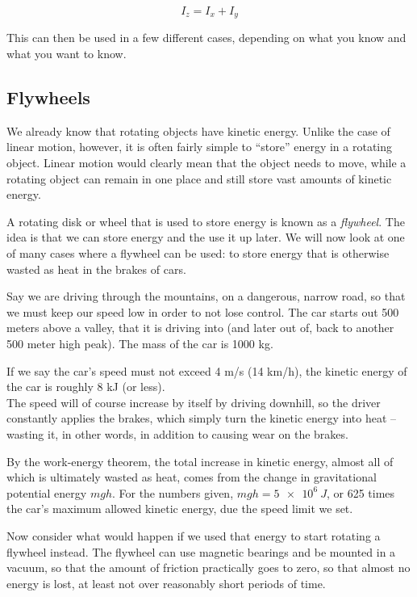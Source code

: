 \documentclass[12pt,a4paper]{report}
\begin{document}
\begin{equation}
I_z = I_x + I_y
\end{equation}

This can then be used in a few different cases, depending on what you know and what you want to know.

\subsection{Flywheels}

We already know that rotating objects have kinetic energy. Unlike the case of linear motion, however, it is often fairly simple to ``store'' energy in a rotating object. Linear motion would clearly mean that the object needs to move, while a rotating object can remain in one place and still store vast amounts of kinetic energy.

A rotating disk or wheel that is used to store energy is known as a \emph{flywheel}. The idea is that we can store energy and the use it up later. We will now look at one of many cases where a flywheel can be used: to store energy that is otherwise wasted as heat in the brakes of cars.

Say we are driving through the mountains, on a dangerous, narrow road, so that we must keep our speed low in order to not lose control. The car starts out 500 meters above a valley, that it is driving into (and later out of, back to another 500 meter high peak). The mass of the car is 1000 kg.

If we say the car's speed must not exceed 4 m/s (14 km/h), the kinetic energy of the car is roughly 8 kJ (or less).\\
The speed will of course increase by itself by driving downhill, so the driver constantly applies the brakes, which simply turn the kinetic energy into heat -- wasting it, in other words, in addition to causing wear on the brakes.

By the work-energy theorem, the total increase in kinetic energy, almost all of which is ultimately wasted as heat, comes from the change in gravitational potential energy $m g h$. For the numbers given, $m g h = \SI{5e6}{J}$, or 625 times the car's maximum allowed kinetic energy, due the speed limit we set.

Now consider what would happen if we used that energy to start rotating a flywheel instead. The flywheel can use magnetic bearings and be mounted in a vacuum, so that the amount of friction practically goes to zero, so that almost no energy is lost, at least not over reasonably short periods of time.
\end{document}
